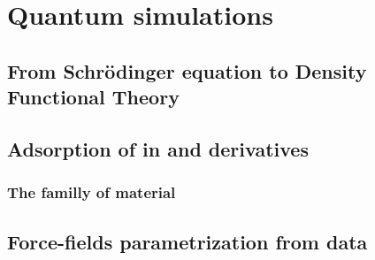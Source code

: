 \documentclass[thesis]{subfiles}
\begin{document}
\chapter{Quantum simulations}

\section{From Schrödinger equation to Density Functional Theory}


\section{Adsorption of  in  and derivatives}

\subsection{The  familly of material}

\section{Force-fields parametrization from \abinitio data}
\end{document}
